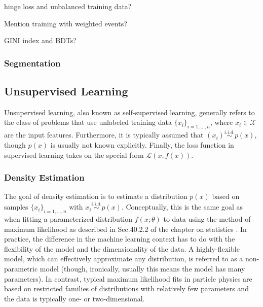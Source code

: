 

hinge loss and unbalanced training data?

Mention training with weighted events?

GINI index and BDTs?


\subsubsection{Segmentation}\label{ML:sec:segmentation}


\subsection{Unsupervised Learning}\label{ML:sec:unsupervised}

Unsupervised learning, also known as self-supervised learning, generally refers to the class of problems that use unlabeled training data $\{x_i\}_{i=1,\dots,n}$, where $x_i \in \mathcal{X}$ are the input features. Furthermore, it is typically assumed that $(x_i) \overset{i.i.d.}{\sim} p(x)$, though $p(x)$ is usually not known explicitly. Finally, the loss function in supervised learning takes on the special form $\mathcal{L}(x, f(x))$. 


\subsubsection{Density Estimation}\label{ML:sec:density_estimation}

The goal of density estimation is to estimate a distribution $p(x)$ based on samples $\{x_i\}_{i=1,\dots,n}$ with $x_i \overset{i.i.d.}{\sim} p(x)$. Conceptually, this is the same goal as when fitting a parameterized distribution $f(x;\theta)$ to data using the method of maximum likelihood as described in Sec.40.2.2 of the chapter on statistics . In practice, the difference in the machine learning context has to do with the flexibility of the model and the dimensionality of the data. A highly-flexible model, which can effectively approximate any distribution, is referred to as a non-parametric model (though, ironically, usually this means the model has many parameters). In contrast, typical maximum likelihood fits in particle physics are based on restricted families of distributions with relatively few parameters and the data is typically one- or two-dimensional. 

